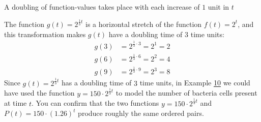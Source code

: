 \documentclass[10pt,]{book}
\theoremstyle{plain}
\theoremstyle{definition}
\theoremstyle{definition}
\theoremstyle{definition}
\numberwithin{equation}{section}
\begin{document}
\hypertarget{p-121}{}%
A doubling of function-values takes place with each increase of \(1\) unit in \(t\)%
\par
\hypertarget{p-122}{}%
The function \(g(t)=2^{\frac{1}{3} t}\) is a horizontal stretch of the function \(f(t)=2^t\), and this transformation makes \(g(t)\) have a doubling time of \(3\) time units:%
%
\begin{align*}
g(3)&=2^{\frac{1}{3} \cdot 3}=2^1=2\\
g(6)&=2^{\frac{1}{3} \cdot 6}=2^2=4\\
g(9)&=2^{\frac{1}{3} \cdot 9}=2^3=8
\end{align*}
\hypertarget{p-123}{}%
Since \(g(t)=2^{\frac{1}{3} t}\) has a doubling time of \(3\) time units, in Example \hyperref[example-doubling-time]{10} we could have used the function \(y = 150 \cdot 2^{\frac{1}{3} t}\) to model the number of bacteria cells present at time \(t\). You can confirm that the two functions \(y = 150 \cdot 2^{\frac{1}{3} t}\) and \(P(t)=150 \cdot (1.26)^t\) produce roughly the same ordered pairs.%
\typeout{************************************************}
\typeout{************************************************}
\end{document}
